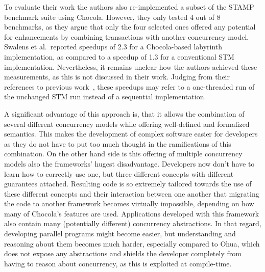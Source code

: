 To evaluate their work the authors also re-implemented a subset of the STAMP benchmark suite using Chocola.
However, they only tested 4 out of 8 benchmarks, as they argue that only the four selected ones offered any potential for enhancements by combining transactions with another concurrency model.
Swalens et al.\ reported speedups of 2.3 for a Chocola-based labyrinth implementation, as compared to a speedup of 1.3 for a conventional STM implementation.
Nevertheless, it remains unclear how the authors achieved these measurements, as this is not discussed in their work.
Judging from their references to previous work~\cite{swalens2016transactional, swalens2017transactional}, these speedups may refer to a one-threaded run of the unchanged STM run instead of a sequential implementation.

A significant advantage of this approach is, that it allows the combination of several different concurrency models while offering well-defined and formalized semantics.
This makes the development of complex software easier for developers as they do not have to put too much thought in the ramifications of this combination.
On the other hand side is this offering of multiple concurrency models also the frameworks' hugest disadvantage.
Developers now don't have to learn how to correctly use one, but three different concepts with different guarantees attached.
Resulting code is so extremely tailored towards the use of these different concepts and their interaction between one another that migrating the code to another framework becomes virtually impossible, depending on how many of Chocola's features are used.
Applications developed with this framework also contain many (potentially different) concurrency abstractions.
In that regard, developing parallel programs might become easier, but understanding and reasoning about them becomes much harder, especially compared to Ohua, which does not expose any abstractions and shields the developer completely from having to reason about concurrency, as this is exploited at compile-time.

